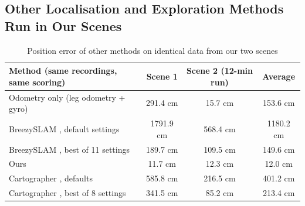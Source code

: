 \documentclass[11pt, a4paper]{article}
\begin{document}
\subsection{Other Localisation and Exploration Methods Run in Our Scenes}
\begin{table}[H]
    \centering
    \footnotesize
    \renewcommand{\arraystretch}{1.2}
    \begin{tabular}{|p{6.8cm}|c|c|c|}
        \hline
        \textbf{Method (same recordings, same scoring)} & \textbf{Scene 1} & \textbf{Scene 2 (12-min run)} & \textbf{Average} \\
        \hline
        Odometry only (leg odometry + gyro) & 291.4 cm & 15.7 cm & 153.6 cm \\
        \hline
        BreezySLAM \cite{steux2010}, default settings & 1791.9 cm & 568.4 cm & 1180.2 cm \\
        \hline
        BreezySLAM \cite{steux2010}, best of 11 settings & 189.7 cm & 109.5 cm & 149.6 cm \\
        \hline
        Ours & 11.7 cm & 12.3 cm & 12.0 cm \\
        \hline
        Cartographer \cite{hess2016}, defaults & 585.8 cm & 216.5 cm & 401.2 cm \\
        \hline
        Cartographer \cite{hess2016}, best of 8 settings & 341.5 cm & 85.2 cm & 213.4 cm \\
        \hline
    \end{tabular}
    \caption{Position error of other methods on identical data from our two scenes}
    \label{tab:others}
\end{table}
\end{document}
